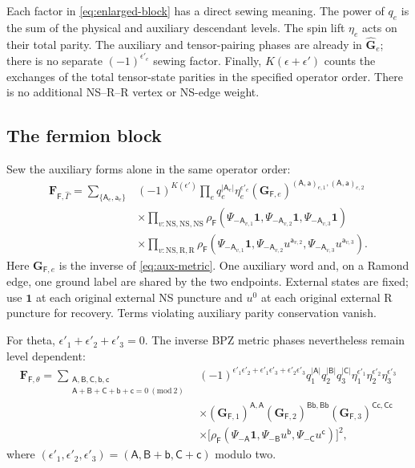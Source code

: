 \documentclass[11pt]{article}
\newcommand{\NS}{\mathrm{NS}}
\newcommand{\R}{\mathrm R}
\newcommand{\F}{\mathsf F}
\numberwithin{equation}{section}
\begin{document}
Each factor in \eqref{eq:enlarged-block} has a direct sewing meaning.
The power of $q_e$ is the sum of the physical and auxiliary descendant
levels. The spin lift $\eta_e$ acts on their total parity. The auxiliary
and tensor-pairing phases are already in $\widehat{\mathbf G}_e$;
there is no separate $(-1)^{\epsilon'_e}$ sewing factor.
Finally, $K(\epsilon+\epsilon')$ counts the
exchanges of the total tensor-state parities in the specified operator
order. There is no additional NS--R--R vertex or NS-edge weight.

\subsection{The fermion block}

Sew the auxiliary forms alone in the same operator order:
\begin{align}
 \mathbf F_{\F,\hat\Gamma}
 =\sum_{\{\mathsf A_e,\mathsf a_e\}}{}&(-1)^{K(\epsilon')}
     \prod_e q_e^{|\mathsf A_e|}\eta_e^{\epsilon'_e}
       (\mathbf G_{\F,e})^{
       (\mathsf A,\mathsf a)_{e,1},(\mathsf A,\mathsf a)_{e,2}}
       \nonumber\\
 &\times\prod_{v:\NS,\NS,\NS}
 \rho_{\F}(\Psi_{-\mathsf A_{v,1}}\mathbf1,
           \Psi_{-\mathsf A_{v,2}}\mathbf1,
           \Psi_{-\mathsf A_{v,3}}\mathbf1)\nonumber\\
 &\times\prod_{v:\NS,\R,\R}
 \rho_{\F}(\Psi_{-\mathsf A_{v,1}}\mathbf1,
           \Psi_{-\mathsf A_{v,2}}u^{\mathsf a_{v,2}},
           \Psi_{-\mathsf A_{v,3}}u^{\mathsf a_{v,3}}).
 \label{eq:fermion-block}
\end{align}
Here $\mathbf G_{\F,e}$ is the inverse of \eqref{eq:aux-metric}.
One auxiliary word and, on a Ramond edge, one ground label are shared by
the two endpoints. External states are fixed; use $\mathbf1$ at each
original external NS puncture and $u^0$ at each original external R
puncture for recovery. Terms violating auxiliary parity conservation vanish.

For theta, $\epsilon'_1+\epsilon'_2+\epsilon'_3=0$. The inverse
BPZ metric phases nevertheless remain level dependent:
\begin{align}
 \mathbf F_{\F,\theta}
 =\sum_{\substack{\mathsf A,\mathsf B,\mathsf C,\mathsf b,\mathsf c\\
       \mathsf A+\mathsf B+\mathsf C+\mathsf b+\mathsf c=0\ (\mathrm{mod}\ 2)}}{}
 &(-1)^{\epsilon'_1\epsilon'_2+\epsilon'_1\epsilon'_3+
                                             \epsilon'_2\epsilon'_3}
 q_1^{|\mathsf A|}q_2^{|\mathsf B|}q_3^{|\mathsf C|}
 \eta_1^{\epsilon'_1}\eta_2^{\epsilon'_2}\eta_3^{\epsilon'_3}\nonumber\\
 &\times(\mathbf G_{\F,1})^{\mathsf A,\mathsf A}
        (\mathbf G_{\F,2})^{\mathsf B\mathsf b,\mathsf B\mathsf b}
        (\mathbf G_{\F,3})^{\mathsf C\mathsf c,\mathsf C\mathsf c}
        \nonumber\\
 &\times\bigl[\rho_{\F}(\Psi_{-\mathsf A}\mathbf1,
           \Psi_{-\mathsf B}u^{\mathsf b},
           \Psi_{-\mathsf C}u^{\mathsf c})\bigr]^2,
 \label{eq:fermion-theta}
\end{align}
where $(\epsilon'_1,\epsilon'_2,\epsilon'_3)
=(\mathsf A,\mathsf B+\mathsf b,\mathsf C+\mathsf c)$ modulo two.
\end{document}
